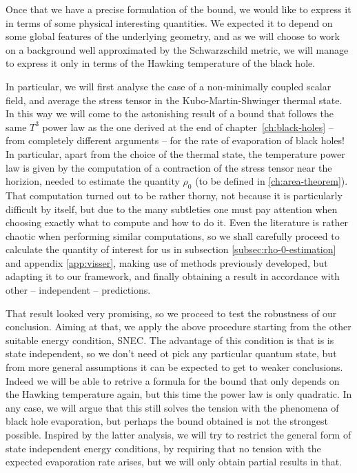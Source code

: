 Once that we have a precise formulation of the bound, we would like to express it in terms of some physical interesting quantities. We expected it to depend on some global features of the underlying geometry, and as we will choose to work on a background well approximated by the Schwarzschild metric, we will manage to express it only in terms of the Hawking temperature of the black hole.  

In particular, we will first analyse the case of a non-minimally coupled scalar field, and average the stress tensor in the Kubo-Martin-Shwinger thermal state. In this way we will come to the astonishing result of a bound that follows the same \(T^3\) power law as the one derived at the end of chapter~\ref{ch:black-holes} -- from completely different arguments -- for the rate of evaporation of black holes!
In particular, apart from the choice of the thermal state, the temperature power law is given by the computation of a contraction of the stress tensor near the horizion, needed to estimate the quantity \(\rho_0\) (to be defined in \ref{ch:area-theorem}). That computation turned out to be rather thorny, not because it is particularly difficult by itself, but due to the many subtleties one must pay attention when choosing exactly what to compute and how to do it. Even the literature is rather chaotic when performing similar computations, so we shall carefully proceed to calculate the quantity of interest for us in subsection \ref{subsec:rho-0-estimation} and appendix \ref{app:visser}, making use of methods previously developed, but adapting it to our framework, and finally obtaining a result in accordance with other -- independent -- predictions. 

That result looked very promising, so we proceed to test the robustness of our conclusion. Aiming at that, we apply the above procedure starting from the other suitable energy condition, SNEC. The advantage of this condition is that is is state independent, so we don't need ot pick any particular quantum state, but from more general assumptions it can be expected to get to weaker conclusions. Indeed we will be able to retrive a formula for the bound that only depends on the Hawking temperature again, but this time the power law is only quadratic.
In any case, we will argue that this still solves the tension with the phenomena of black hole evaporation, but perhaps the bound obtained is not the strongest possible.
Inspired by the latter analysis, we will try to restrict the general form of state independent energy conditions, by requiring that no tension with the expected evaporation rate arises, but we will only obtain partial results in that.

